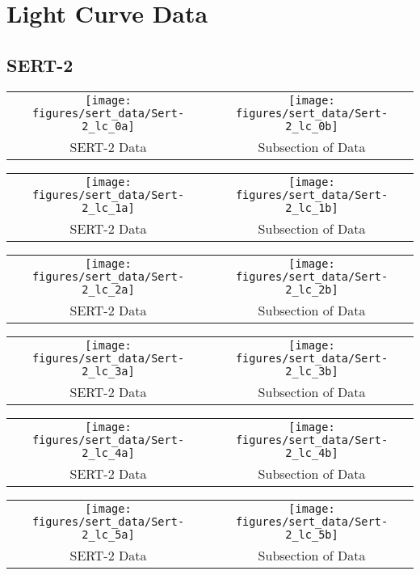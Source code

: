 \chapter{Light Curve Data}

\section{SERT-2}

\begin{tabular}{cc}
	\texttt{[image: figures/sert\_data/Sert-2\_lc\_0a]}  & \texttt{[image: figures/sert\_data/Sert-2\_lc\_0b]} \\
	SERT-2 Data & Subsection of Data
\end{tabular}

\begin{tabular}{cc}
	\texttt{[image: figures/sert\_data/Sert-2\_lc\_1a]}  & \texttt{[image: figures/sert\_data/Sert-2\_lc\_1b]} \\
	SERT-2 Data & Subsection of Data
\end{tabular}

\begin{tabular}{cc}
	\texttt{[image: figures/sert\_data/Sert-2\_lc\_2a]}  & \texttt{[image: figures/sert\_data/Sert-2\_lc\_2b]} \\
	SERT-2 Data & Subsection of Data
\end{tabular}

\begin{tabular}{cc}
	\texttt{[image: figures/sert\_data/Sert-2\_lc\_3a]}  & \texttt{[image: figures/sert\_data/Sert-2\_lc\_3b]} \\
	SERT-2 Data & Subsection of Data
\end{tabular}

\begin{tabular}{cc}
	\texttt{[image: figures/sert\_data/Sert-2\_lc\_4a]}  & \texttt{[image: figures/sert\_data/Sert-2\_lc\_4b]} \\
	SERT-2 Data & Subsection of Data
\end{tabular}

\begin{tabular}{cc}
	\texttt{[image: figures/sert\_data/Sert-2\_lc\_5a]}  & \texttt{[image: figures/sert\_data/Sert-2\_lc\_5b]} \\
	SERT-2 Data & Subsection of Data
\end{tabular}

